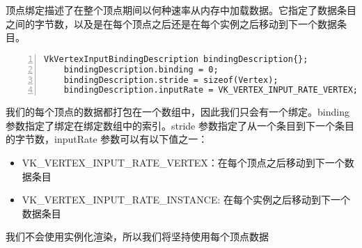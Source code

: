 \documentclass{ctexart}
\begin{document}
顶点绑定描述了在整个顶点期间以何种速率从内存中加载数据。它指定了数据条目之间的字节数，以及是在每个顶点之后还是在每个实例之后移动到下一个数据条目。
\begin{lstlisting}[language={[ANSI]C},keywordstyle=\color{blue!70},commentstyle=\color{red!50!green!50!blue!50},frame=shadowbox, rulesepcolor=\color{red!20!green!20!blue!20},basicstyle=\small,numbers=left, numberstyle=\tiny,breaklines=true]
	VkVertexInputBindingDescription bindingDescription{};
	bindingDescription.binding = 0;
	bindingDescription.stride = sizeof(Vertex);
	bindingDescription.inputRate = VK_VERTEX_INPUT_RATE_VERTEX;	
\end{lstlisting}

我们的每个顶点的数据都打包在一个数组中，因此我们只会有一个绑定。binding 参数指定了绑定在绑定数组中的索引。stride 参数指定了从一个条目到下一个条目的字节数，inputRate 参数可以有以下值之一：
\begin{itemize}
	\item VK\_VERTEX\_INPUT\_RATE\_VERTEX：在每个顶点之后移动到下一个数据条目
	\item VK\_VERTEX\_INPUT\_RATE\_INSTANCE: 在每个实例之后移动到下一个数据条目
\end{itemize}
我们不会使用实例化渲染，所以我们将坚持使用每个顶点数据
\end{document}
